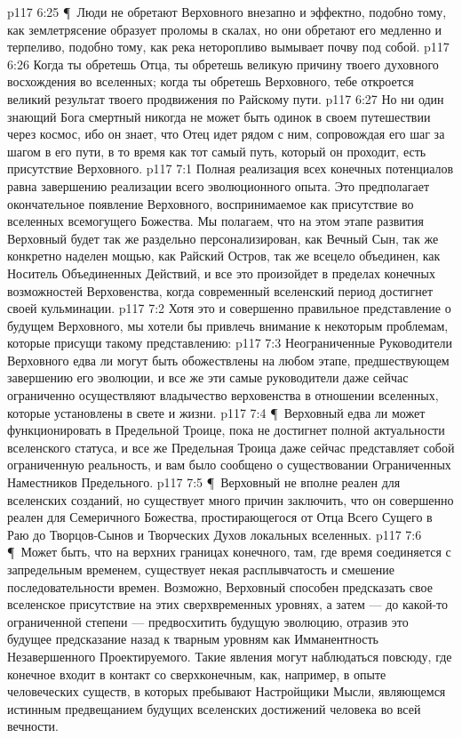 \vs p117 6:25 \P\ Люди не обретают Верховного внезапно и эффектно, подобно тому, как землетрясение образует проломы в скалах, но они обретают его медленно и терпеливо, подобно тому, как река неторопливо вымывает почву под собой.
\vs p117 6:26 Когда ты обретешь Отца, ты обретешь великую причину твоего духовного восхождения во вселенных; когда ты обретешь Верховного, тебе откроется великий результат твоего продвижения по Райскому пути.
\vs p117 6:27 Но ни один знающий Бога смертный никогда не может быть одинок в своем путешествии через космос, ибо он знает, что Отец идет рядом с ним, сопровождая его шаг за шагом в его пути, в то время как тот самый путь, который он проходит, есть присутствие Верховного.
\vs p117 7:1 Полная реализация всех конечных потенциалов равна завершению реализации всего эволюционного опыта. Это предполагает окончательное появление Верховного, воспринимаемое как присутствие во вселенных всемогущего Божества. Мы полагаем, что на этом этапе развития Верховный будет так же раздельно персонализирован, как Вечный Сын, так же конкретно наделен мощью, как Райский Остров, так же всецело объединен, как Носитель Объединенных Действий, и все это произойдет в пределах конечных возможностей Верховенства, когда современный вселенский период достигнет своей кульминации.
\vs p117 7:2 Хотя это и совершенно правильное представление о будущем Верховного, мы хотели бы привлечь внимание к некоторым проблемам, которые присущи такому представлению:
\vs p117 7:3 \bibnobreakspace Неограниченные Руководители Верховного едва ли могут быть обожествлены на любом этапе, предшествующем завершению его эволюции, и все же эти самые руководители даже сейчас ограниченно осуществляют владычество верховенства в отношении вселенных, которые установлены в свете и жизни.
\vs p117 7:4 \P\ \bibnobreakspace Верховный едва ли может функционировать в Предельной Троице, пока не достигнет полной актуальности вселенского статуса, и все же Предельная Троица даже сейчас представляет собой ограниченную реальность, и вам было сообщено о существовании Ограниченных Наместников Предельного.
\vs p117 7:5 \P\ \bibnobreakspace Верховный не вполне реален для вселенских созданий, но существует много причин заключить, что он совершенно реален для Семеричного Божества, простирающегося от Отца Всего Сущего в Раю до Творцов\hyp{}Сынов и Творческих Духов локальных вселенных.
\vs p117 7:6 \P\ Может быть, что на верхних границах конечного, там, где время соединяется с запредельным временем, существует некая расплывчатость и смешение последовательности времен. Возможно, Верховный способен предсказать свое вселенское присутствие на этих сверхвременных уровнях, а затем --- до какой\hyp{}то ограниченной степени --- предвосхитить будущую эволюцию, отразив это будущее предсказание назад к тварным уровням как Имманентность Незавершенного Проектируемого. Такие явления могут наблюдаться повсюду, где конечное входит в контакт со сверхконечным, как, например, в опыте человеческих существ, в которых пребывают Настройщики Мысли, являющемся истинным предвещанием будущих вселенских достижений человека во всей вечности.
